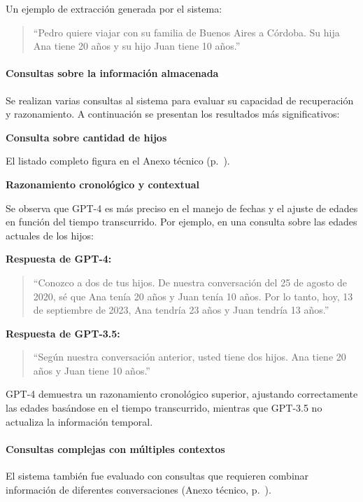 Un ejemplo de extracción generada por el sistema:

\begin{quote}
``Pedro quiere viajar con su familia de Buenos Aires a Córdoba. Su hija Ana tiene 20 años y su hijo Juan tiene 10 años.''
\end{quote}

\paragraph{Consultas sobre la información almacenada}

Se realizan varias consultas al sistema para evaluar su capacidad de recuperación y razonamiento. A continuación se presentan los resultados más significativos:

\textbf{Consulta sobre cantidad de hijos}

El listado completo figura en el Anexo técnico (p.~\pageref{anexo:code-4-1-13-4}).

\textbf{Razonamiento cronológico y contextual}

Se observa que GPT-4 es más preciso en el manejo de fechas y el ajuste de edades en función del tiempo transcurrido. Por ejemplo, en una consulta sobre las edades actuales de los hijos:

\textbf{Respuesta de GPT-4:}
\begin{quote}
``Conozco a dos de tus hijos. De nuestra conversación del 25 de agosto de 2020, sé que Ana tenía 20 años y Juan tenía 10 años. Por lo tanto, hoy, 13 de septiembre de 2023, Ana tendría 23 años y Juan tendría 13 años.''
\end{quote}

\textbf{Respuesta de GPT-3.5:}
\begin{quote}
``Según nuestra conversación anterior, usted tiene dos hijos. Ana tiene 20 años y Juan tiene 10 años.''
\end{quote}

GPT-4 demuestra un razonamiento cronológico superior, ajustando correctamente las edades basándose en el tiempo transcurrido, mientras que GPT-3.5 no actualiza la información temporal.

\paragraph{Consultas complejas con múltiples contextos}

El sistema también fue evaluado con consultas que requieren combinar información de diferentes conversaciones (Anexo técnico, p.~\pageref{anexo:code-4-1-13-5}).

